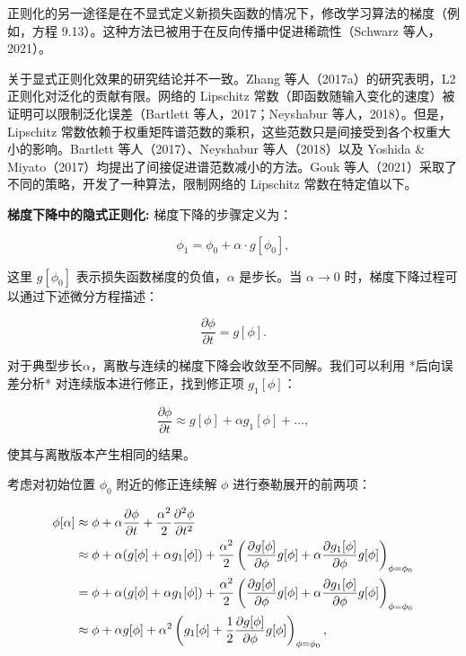 \documentclass[lang=cn,newtx,10pt,scheme=chinese]{elegantbook}
\begin{document}
正则化的另一途径是在不显式定义新损失函数的情况下，修改学习算法的梯度（例如，方程 9.13）。这种方法已被用于在反向传播中促进稀疏性（Schwarz 等人，2021）。

关于显式正则化效果的研究结论并不一致。Zhang 等人（2017a）的研究表明，L2 正则化对泛化的贡献有限。网络的 Lipschitz 常数（即函数随输入变化的速度）被证明可以限制泛化误差（Bartlett 等人，2017；Neyshabur 等人，2018）。但是，Lipschitz 常数依赖于权重矩阵谱范数的乘积，这些范数只是间接受到各个权重大小的影响。Bartlett 等人（2017）、Neyshabur 等人（2018）以及 Yoshida \& Miyato（2017）均提出了间接促进谱范数减小的方法。Gouk 等人（2021）采取了不同的策略，开发了一种算法，限制网络的 Lipschitz 常数在特定值以下。

\textbf{梯度下降中的隐式正则化:} 梯度下降的步骤定义为：

\begin{equation}
\phi_1 = \phi_0 + \alpha \cdot g[\phi_0], 
\end{equation}

这里 \(g[\phi_0]\) 表示损失函数梯度的负值，\(\alpha\) 是步长。当 \(\alpha \rightarrow 0\) 时，梯度下降过程可以通过下述微分方程描述：

\begin{equation}
\frac{\partial \phi}{\partial t} = g[\phi]. 
\end{equation}

对于典型步长\(\alpha\)，离散与连续的梯度下降会收敛至不同解。我们可以利用 *后向误差分析* 对连续版本进行修正，找到修正项 \(g_1[\phi]\)：

\begin{equation}
\frac{\partial \phi}{\partial t} \approx g[\phi] + \alpha g_1[\phi] + \ldots, 
\end{equation}

使其与离散版本产生相同的结果。

考虑对初始位置  \(\phi_0\) 附近的修正连续解 \(\phi\) 进行泰勒展开的前两项：


\begin{align}
	\phi[\alpha] &\approx \phi + \alpha \frac{\partial \phi}{\partial t} + \frac{\alpha^2}{2} \frac{\partial^2 \phi}{\partial t^2} \notag \\
	&\approx \phi + \alpha (g[\phi] + \alpha g_1[\phi]) + \frac{\alpha^2}{2} \left( \frac{\partial g[\phi]}{\partial \phi} g[\phi] + \alpha \frac{\partial g_1[\phi]}{\partial \phi} g[\phi] \right)_{\phi=\phi_0} \notag \\
	&= \phi + \alpha (g[\phi] + \alpha g_1[\phi]) + \frac{\alpha^2}{2} \left( \frac{\partial g[\phi]}{\partial \phi} g[\phi] + \alpha \frac{\partial g_1[\phi]}{\partial \phi} g[\phi] \right)_{\phi=\phi_0} \notag \\
	&\approx \phi + \alpha g[\phi] + \alpha^2 \left( g_1[\phi] + \frac{1}{2} \frac{\partial g[\phi]}{\partial \phi} g[\phi] \right)_{\phi=\phi_0} , 
\end{align} 
\end{document}
